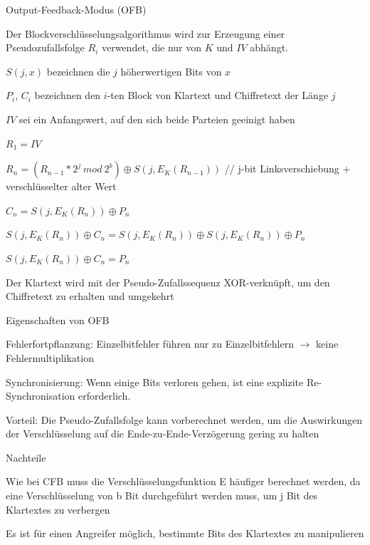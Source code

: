 \documentclass[a4paper]{article}
\begin{document}
\begin{multicols}{3}
      Output-Feedback-Modus (OFB)
      \begin{itemize*}
            \item Der Blockverschlüsselungsalgorithmus wird zur Erzeugung einer Pseudozufallsfolge $R_i$ verwendet, die nur von $K$ und $IV$ abhängt.
            \begin{itemize*}
                  \item $S(j, x)$ bezeichnen die $j$ höherwertigen Bits von $x$
                  \item $P_i$, $C_i$ bezeichnen den $i$-ten Block von Klartext und Chiffretext der Länge $j$
                  \item $IV$ sei ein Anfangswert, auf den sich beide Parteien geeinigt haben
                  \item $R_1 = IV$
                  \item $R_n = (R_{n-1}* 2^j\ mod\ 2^b )\oplus S(j,E_K(R_{n-1}))$ // j-bit Linksverschiebung + verschlüsselter alter Wert
                  \item $C_n = S(j,E_K(R_n))\oplus P_n$
                  \item $S(j,E_K(R_n))\oplus C_n = S(j,E_K(R_n))\oplus S(j,E_K(R_n))\oplus P_n$
                  \item $S(j,E_K(R_n))\oplus C_n = P_n$
            \end{itemize*}
            \item Der Klartext wird mit der Pseudo-Zufallssequenz XOR-verknüpft, um den Chiffretext zu erhalten und umgekehrt
            \item Eigenschaften von OFB
            \begin{itemize*}
                  \item Fehlerfortpflanzung: Einzelbitfehler führen nur zu Einzelbitfehlern $\rightarrow$ keine Fehlermultiplikation
                  \item Synchronisierung: Wenn einige Bits verloren gehen, ist eine explizite Re-Synchronisation erforderlich.
                  \item Vorteil: Die Pseudo-Zufallsfolge kann vorberechnet werden, um die Auswirkungen der Verschlüsselung auf die Ende-zu-Ende-Verzögerung gering zu halten
                  \item Nachteile
                  \begin{itemize*}
                        \item Wie bei CFB muss die Verschlüsselungsfunktion E häufiger berechnet werden, da eine Verschlüsselung von b Bit durchgeführt werden muss, um j Bit des Klartextes zu verbergen
                        \item Es ist für einen Angreifer möglich, bestimmte Bits des Klartextes zu manipulieren
                  \end{itemize*}
            \end{itemize*}
      \end{itemize*}


\end{multicols}
\end{document}
